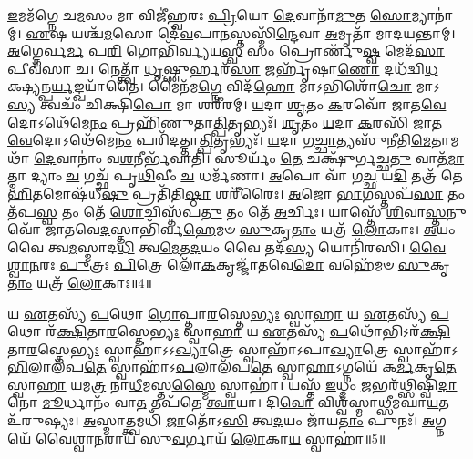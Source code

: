 \-\ul{𑌇}\-𑌮𑌮᳴𑌗𑍍𑌨𑍇 𑌚\-\ul{𑌮}\-𑌸𑌂 𑌮𑌾 𑌵𑌿𑌜𑍀॑𑌹𑍍𑌵𑌰𑌃 \ul{𑌪𑍍𑌰𑌿}\-𑌯𑍋 \ul{𑌦𑍇}\-𑌵𑌾𑌨𑌾᳴\-\ul{𑌮𑍁}\-𑌤 \ul{𑌸𑍋}\-𑌮𑍍𑌯𑌾𑌨𑌾॑𑌮𑍍। 
\-\ul{𑌏}\-𑌷 𑌯𑌶𑍍𑌚᳴\-\ul{𑌮}\-𑌸𑍋 𑌦𑍇᳴\-\ul{𑌵}\-𑌪𑌾\-\ul{𑌨}\-𑌸𑍍𑌤𑌸𑍍𑌮𑌿᳴\-\ul{𑌨𑍍𑌦𑍇}\-𑌵𑌾 \ul{𑌅}\-𑌮𑍃𑌤𑌾᳴ 𑌮𑌾𑌦𑌯𑌨𑍍𑌤𑌾𑌮𑍍। 
\-\ul{𑌅}\-𑌗𑍍𑌨𑍇𑌰𑍍𑌵\-\ul{𑌰𑍍𑌮} 𑌪\-\ul{𑌰𑌿} 𑌗𑍋𑌭𑌿᳴𑌰𑍍𑌵𑍍𑌯𑌯\-\ul{𑌸𑍍𑌵} 𑌸𑌂 𑌪𑍍𑌰𑍋𑌰𑍍𑌣𑍁᳴\-\ul{𑌷𑍍𑌵} 𑌮𑍇𑌦᳴\-\ul{𑌸𑌾} 𑌪𑍀𑌵᳴𑌸𑌾 𑌚। 
𑌨𑍇𑌤𑍍𑌤𑍍𑌵𑌾᳴ \ul{𑌧𑍃}\-𑌷𑍍𑌣𑍁𑌰𑍍\mbox{}𑌹𑌰᳴\-\ul{𑌸𑌾} 𑌜𑌰𑍍\mbox{}𑌹𑍃᳴𑌷𑌾\-\ul{𑌣𑍋} 𑌦𑌧᳴𑌦𑍍𑌵𑌿\-\ul{𑌧}\-𑌕𑍍𑌷𑍍𑌯𑌨𑍍𑌪\-\ul{𑌰𑍍𑌯}\-𑌙𑍍𑌖𑌯𑌾᳴𑌤𑍈। 
𑌮𑍈𑌨᳴𑌮\-\ul{𑌗𑍍𑌨𑍇} 𑌵𑌿𑌦᳴\-\ul{𑌹𑍋} 𑌮𑌾𑌽𑌭𑌿𑌶𑍋᳴\-\ul{𑌚𑍋} 𑌮𑌾𑌽\-\ul{𑌸𑍍𑌯} 𑌤𑍍𑌵𑌚𑌂᳴ 𑌚𑌿𑌕𑍍𑌷𑌿\-\ul{𑌪𑍋} 𑌮𑌾 𑌶𑌰𑍀᳴𑌰𑌮𑍍। 
\-\ul{𑌯}\-𑌦𑌾 \ul{𑌶𑍃}\-𑌤𑌂 \ul{𑌕}\-𑌰𑌵𑍋᳴ 𑌜𑌾𑌤\-\ul{𑌵𑍇}\-𑌦𑍋𑌽𑌥𑍇᳴𑌮𑍇\-\ul{𑌨𑌂} 𑌪𑍍𑌰𑌹𑌿᳴𑌣𑍁𑌤𑌾\-\ul{𑌤𑍍𑌪𑌿}\-𑌤𑍃𑌭𑍍𑌯𑌃᳴। 
\-\ul{𑌶𑍃}\-𑌤𑌂 \ul{𑌯}\-𑌦𑌾 \ul{𑌕}\-𑌰𑌸𑌿᳴ 𑌜𑌾𑌤\-\ul{𑌵𑍇}\-𑌦𑍋𑌽𑌥𑍇᳴𑌮𑍇\-\ul{𑌨𑌂} 𑌪𑌰𑌿᳴𑌦𑌤𑍍𑌤𑌾\-\ul{𑌤𑍍𑌪𑌿}\-𑌤𑍃𑌭𑍍𑌯𑌃᳴। 
\-\ul{𑌯}\-𑌦𑌾 𑌗\-\ul{𑌚𑍍𑌛𑌾}\-𑌤𑍍𑌯𑌸𑍁᳴𑌨𑍀𑌤𑌿\-\ul{𑌮𑍇}\-𑌤𑌾𑌮𑌥𑌾᳴ \ul{𑌦𑍇}\-𑌵𑌾𑌨𑌾𑌂॑ 𑌵\-\ul{𑌶}\-𑌨𑍀𑌰𑍍𑌭᳴𑌵𑌾𑌤𑌿। 
𑌸𑍂𑌰𑍍𑌯𑌂᳴ \ul{𑌤𑍇} 𑌚𑌕𑍍𑌷𑍁᳴𑌰𑍍𑌗𑌚𑍍𑌛\-\ul{𑌤𑍁} 𑌵𑌾𑌤᳴\-\ul{𑌮𑌾}\-𑌤𑍍𑌮𑌾 𑌦𑍍𑌯𑌾𑌂 \ul{𑌚} 𑌗𑌚𑍍𑌛᳴ 𑌪𑍃\-\ul{𑌥𑌿}\-𑌵𑍀𑌂 \ul{𑌚} 𑌧𑌰𑍍𑌮᳴𑌣𑌾। 
\-\ul{𑌅}\-𑌪𑍋 𑌵𑌾᳴ 𑌗\-\ul{𑌚𑍍𑌛} 𑌯\-\ul{𑌦𑌿} 𑌤𑌤𑍍𑌰᳴ 𑌤𑍇 \ul{𑌹𑌿}\-𑌤𑌮𑍋𑌷᳴𑌧𑍀\-\ul{𑌷𑍁} 𑌪𑍍𑌰𑌤𑌿᳴𑌤𑌿\-\ul{𑌷𑍍𑌠𑌾} 𑌶𑌰𑍀᳴𑌰𑍈𑌃। 
\-\ul{𑌅}\-𑌜𑍋 \ul{𑌭𑌾}\-𑌗𑌸𑍍𑌤𑌪᳴\-\ul{𑌸𑌾} 𑌤𑌂 𑌤᳴𑌪\-\ul{𑌸𑍍𑌵} 𑌤𑌂 𑌤𑍇᳴ \ul{𑌶𑍋}\-𑌚𑌿𑌸𑍍𑌤᳴𑌪\-\ul{𑌤𑍁} 𑌤𑌂 𑌤𑍇᳴ \ul{𑌅}\-𑌰𑍍𑌚𑌿𑌃। 
𑌯𑌾𑌸𑍍𑌤𑍇᳴ \ul{𑌶𑌿}\-𑌵𑌾\-\ul{𑌸𑍍𑌤}\-𑌨𑍁𑌵𑍋᳴ 𑌜𑌾𑌤𑌵𑍇\-\ul{𑌦}\-𑌸𑍍𑌤𑌾𑌭𑌿᳴𑌰𑍍𑌵\-\ul{𑌹𑍇}\-𑌮𑍞 \ul{𑌸𑍁}\-𑌕𑍃\-\ul{𑌤𑌾𑌂} 𑌯𑌤𑍍𑌰᳴ \ul{𑌲𑍋}\-𑌕𑌾𑌃। 
\-\ul{𑌅}\-𑌯𑌂 𑌵𑍈 𑌤𑍍𑌵\-\ul{𑌮}\-𑌸𑍍𑌮𑌾𑌦\-\ul{𑌧𑌿} 𑌤𑍍𑌵\-\ul{𑌮𑍇}\-𑌤\-\ul{𑌦}\-𑌯𑌂 𑌵𑍈 𑌤𑌦᳴\-\ul{𑌸𑍍𑌯} 𑌯𑍋𑌨𑌿᳴𑌰𑌸𑌿। 
\-\ul{𑌵𑍈}\-\-\ul{𑌶𑍍𑌵𑌾}\-\-\ul{𑌨}\-𑌰𑌃 \ul{𑌪𑍁}\-𑌤𑍍𑌰𑌃 \ul{𑌪𑌿}\-𑌤𑍍𑌰𑍇 𑌲𑍋᳴\-\ul{𑌕}\-𑌕𑍃𑌜𑍍𑌜𑌾᳴𑌤𑌵𑍇\-\ul{𑌦𑍋} 𑌵𑌹𑍇᳴𑌮𑍞 \ul{𑌸𑍁}\-𑌕𑍃\-\ul{𑌤𑌾𑌂} 𑌯𑌤𑍍𑌰᳴ \ul{𑌲𑍋}\-𑌕𑌾𑌃॥4॥
\anuvakamend[\-\ul{𑌵𑌿}\-𑌦𑍍𑌵𑌾\-\ul{𑌨}\-𑌭𑍍𑌯𑌾𑌵᳴𑌵𑍃\-\ul{𑌥𑍍𑌸𑍍𑌵𑌾}\-𑌭𑌿𑌮𑌾᳴𑌤𑍀𑌰𑍍𑌜𑌯𑍇\-\ul{𑌮} 𑌶𑌰𑍀᳴𑌰𑍈\-\ul{𑌶𑍍𑌚}\-𑌤𑍍𑌵𑌾𑌰𑌿᳴ 𑌚]

𑌯 \ul{𑌏}\-𑌤𑌸𑍍𑌯᳴ \ul{𑌪}\-𑌥𑍋 \ul{𑌗𑍋}\-𑌪𑍍𑌤𑌾\-\ul{𑌰}\-𑌸𑍍𑌤𑍇\-\ul{𑌭𑍍𑌯𑌃} 𑌸𑍍𑌵𑌾\-\ul{𑌹𑌾} 𑌯 \ul{𑌏}\-𑌤𑌸𑍍𑌯᳴ \ul{𑌪}\-𑌥𑍋 𑌰᳴\-\ul{𑌕𑍍𑌷𑌿}\-𑌤𑌾\-\ul{𑌰}\-𑌸𑍍𑌤𑍇\-\ul{𑌭𑍍𑌯𑌃} 𑌸𑍍𑌵𑌾\-\ul{𑌹𑌾} 𑌯 \ul{𑌏}\-𑌤𑌸𑍍𑌯᳴ \ul{𑌪}\-𑌥𑍋᳴𑌭𑌿𑌽𑌰᳴\-\ul{𑌕𑍍𑌷𑌿}\-𑌤𑌾\-\ul{𑌰}\-𑌸𑍍𑌤𑍇\-\ul{𑌭𑍍𑌯𑌃} 𑌸𑍍𑌵𑌾𑌹𑌾॑\-𑌽\-𑌽\-\-\ul{𑌖𑍍𑌯𑌾}\-𑌤𑍍𑌰𑍇 𑌸𑍍𑌵𑌾𑌹𑌾᳴𑌽𑌪𑌾\-\ul{𑌖𑍍𑌯𑌾}\-𑌤𑍍𑌰𑍇 𑌸𑍍𑌵𑌾𑌹𑌾᳴𑌽\-\ul{𑌭𑌿}\-𑌲𑌾𑌲᳴𑌪\-\ul{𑌤𑍇} 𑌸𑍍𑌵𑌾𑌹𑌾᳴𑌽\-\-\ul{𑌪}\-𑌲𑌾𑌲᳴\-𑌪\-\ul{𑌤𑍇} 𑌸𑍍𑌵𑌾\-\ul{𑌹𑌾}\-𑌽𑌗𑍍𑌨𑌯𑍇᳴ 𑌕\-\ul{𑌰𑍍𑌮}\-𑌕𑍃\-\ul{𑌤𑍇} 𑌸𑍍𑌵𑌾\-\ul{𑌹𑌾} 𑌯𑌮\-\ul{𑌤𑍍𑌰} 𑌨𑌾\-\ul{𑌧𑍀}\-𑌮𑌸𑍍𑌤\-\ul{𑌸𑍍𑌮𑍈} 𑌸𑍍𑌵𑌾𑌹𑌾॑। 
𑌯𑌸𑍍𑌤᳴ \ul{𑌇}\-𑌧𑍍𑌮𑌂 \ul{𑌜}\-𑌭𑌰᳴𑌥𑍍𑌸𑌿𑌷𑍍𑌵𑌿\-\ul{𑌦𑌾}\-𑌨𑍋 \ul{𑌮𑍂}\-𑌰𑍍𑌧𑌾𑌨𑌂᳴ 𑌵𑌾\-\ul{𑌤} 𑌤𑌪᳴𑌤𑍇 \ul{𑌤𑍍𑌵𑌾}\-𑌯𑌾। 
𑌦𑌿\-\ul{𑌵𑍋} 𑌵𑌿𑌶𑍍𑌵᳴𑌸𑍍𑌮𑌾𑌥𑍍𑌸𑍀𑌮𑌘𑌾\-\ul{𑌯}\-𑌤 𑌉᳴𑌰𑍁𑌷𑍍𑌯𑌃। 
\-\ul{𑌅}\-𑌸𑍍𑌮𑌾𑌤𑍍𑌤𑍍𑌵𑌮𑌧𑌿᳴ \ul{𑌜𑌾}\-𑌤𑍋᳴𑌽\-\ul{𑌸𑌿} 𑌤𑍍𑌵\-\ul{𑌦}\-𑌯𑌂 𑌜𑌾᳴𑌯\-\ul{𑌤𑌾𑌂} 𑌪𑍁𑌨𑌃᳴। 
\-\ul{𑌅}\-𑌗𑍍𑌨𑌯𑍇᳴ 𑌵𑍈𑌶𑍍𑌵𑌾\-\ul{𑌨}\-𑌰𑌾𑌯᳴ 𑌸𑍁\-\ul{𑌵}\-𑌰𑍍𑌗𑌾𑌯᳴ \ul{𑌲𑍋}\-𑌕𑌾\-\ul{𑌯} 𑌸𑍍𑌵𑌾𑌹𑌾॑॥5॥
\anuvakamend[𑌯 \ul{𑌏}\-𑌤\-\ul{𑌸𑍍𑌯} 𑌤𑍍𑌵𑌤𑍍𑌪𑌞𑍍𑌚᳴]


